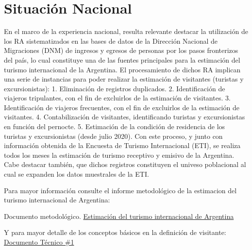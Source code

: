 \documentclass[
]{book}
\begin{document}
\hypertarget{situaciuxf3n-nacional}{%
\section{Situación Nacional}\label{situaciuxf3n-nacional}}

En el marco de la experiencia nacional, resulta relevante destacar la utilización de los RA sistematizados en las bases de datos de la Dirección Nacional de Migraciones (DNM) de ingresos y egresos de personas por los pasos fronterizos del país, lo cual constituye una de las fuentes principales para la estimación del turismo internacional de la Argentina. El procesamiento de dichos RA implican una serie de instancias para poder realizar la estimación de visitantes (turistas y excursionistas):
1. Eliminación de registros duplicados.
2. Identificación de viajeros tripulantes, con el fin de excluirlos de la estimación de visitantes.
3. Identificación de viajeros frecuentes, con el fin de excluirlos de la estimación de visitantes.
4. Contabilización de visitantes, identificando turistas y excursionistas en función del pernocte.
5. Estimación de la condición de residencia de los turistas y excursionistas (desde julio 2020).
Con este proceso, y junto con información obtenida de la Encuesta de Turismo Internacional (ETI), se realiza todos los meses la estimación de turismo receptivo y emisivo de la Argentina. Cabe destacar también, que dichos registros constituyen el univeso poblacional al cual se expanden los datos muestrales de la ETI.

Para mayor información consulte el informe metodológico de la estimacion del turismo internacional de Argentina:

Documento metodológico. \href{https://www.yvera.tur.ar/estadistica/informe/documentos/descarga/5dc0460bcfa3e053142696.pdf}{Estimación del turismo internacional de Argentina}

Y para mayor detalle de los conceptos básicos en la definición de visitante: \href{https://dnme-minturdep.github.io/DT1_medicion_turismo/flujo-turistico.html\#medici\%C3\%B3n}{Documento Técnico \#1}
\end{document}

